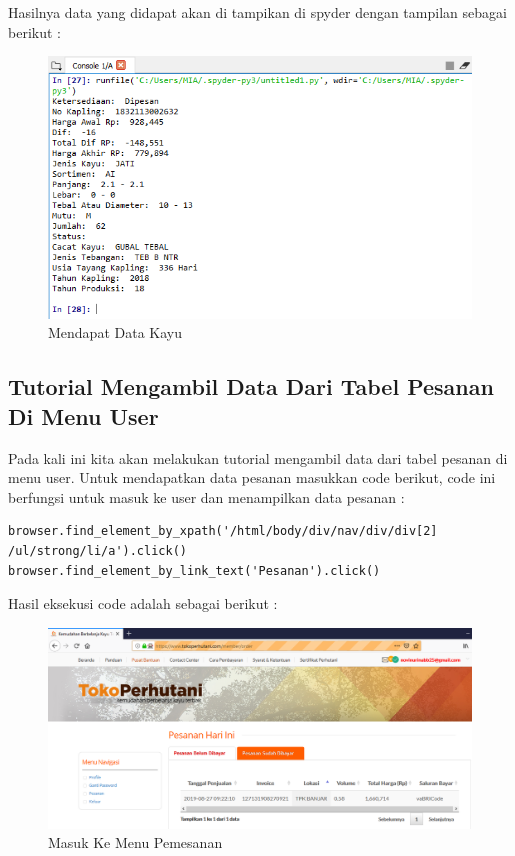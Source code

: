 Hasilnya data yang didapat akan di tampikan di spyder dengan tampilan sebagai berikut :
\begin{figure}[h]
	\centering
	\includegraphics[scale=0.6]{figures/mendapatdatakayu}
	\caption{Mendapat Data Kayu}
\end{figure}

\subsection{Tutorial Mengambil Data Dari Tabel Pesanan Di Menu User}
Pada kali ini kita akan melakukan tutorial mengambil data dari tabel pesanan di menu user. Untuk mendapatkan data pesanan masukkan code berikut, code ini berfungsi untuk masuk ke user dan menampilkan data pesanan :
\begin{verbatim}
browser.find_element_by_xpath('/html/body/div/nav/div/div[2]
/ul/strong/li/a').click()
browser.find_element_by_link_text('Pesanan').click()
\end{verbatim}

Hasil eksekusi code adalah sebagai berikut :
\begin{figure}[h]
	\centering
	\includegraphics[scale=0.3]{figures/datapesanan}
	\caption{Masuk Ke Menu Pemesanan}
\end{figure}

